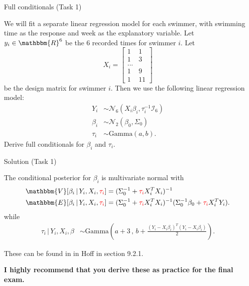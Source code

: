 \documentclass[
  ignorenonframetext,
]{beamer}
\begin{document}
\begin{frame}{Full conditionals (Task 1)}
\protect\hypertarget{full-conditionals-task-1}{}

We will fit a separate linear regression model for each swimmer, with
swimming time as the response and week as the explanatory variable. Let
\(y_{i}\in \mathbbm{R}^{6}\) be the 6 recorded times for swimmer \(i.\)
Let \[X_i =
\begin{bmatrix}
    1 & 1  \\
    1 & 3 \\ 
    ... \\
    1 & 9\\
    1 & 11
\end{bmatrix}
\] be the design matrix for swimmer \(i.\) Then we use the following
linear regression model: \begin{align*}
    Y_i &\sim \mathcal{N}_6\left(X_i\beta_i, \tau_i^{-1}\mathcal{I}_6\right) \\
    \beta_i &\sim \mathcal{N}_2\left(\beta_0, \Sigma_0\right) \\
    \tau_i &\sim \text{Gamma}(a,b).
\end{align*} Derive full conditionals for \(\beta_i\) and \(\tau_i.\)

\end{frame}

\begin{frame}{Solution (Task 1)}
\protect\hypertarget{solution-task-1}{}

The conditional posterior for \(\beta_i\) is multivariate normal with
\begin{align*}
    \mathbbm{V}[\beta_i \, | \, Y_i, X_i, \textcolor{red}{\tau_i} ] &= (\Sigma_0^{-1} + \textcolor{red}{\tau_i} X_i^{T}X_i)^{-1}\\ 
    \mathbbm{E}[\beta_i \, | \, Y_i, X_i, \textcolor{red}{\tau_i} ] &= 
    (\Sigma_0^{-1} + \textcolor{red}{\tau_i} X_i^{T}X_i)^{-1} (\Sigma_0^{-1}\beta_0 + \textcolor{red}{\tau_i} X_i^{T}Y_i).
\end{align*} while \begin{align*}
    \tau_i \, | \, Y_i, X_i, \beta &\sim \text{Gamma}\left(a + 3\, , \, b + \frac{(Y_i - X_i\beta_i)^{T}(Y_i - X_i\beta_i)}{2} \right).
\end{align*}

These can be found in in Hoff in section 9.2.1.

\textbf{I highly recommend that you derive these as practice for the final exam.}

\end{frame}
\end{document}
